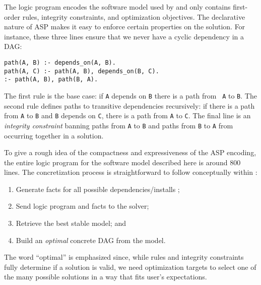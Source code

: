 The logic program encodes the software model used by \spack{} and only contains
first-order rules, integrity constraints, and optimization objectives. The declarative
nature of ASP makes it easy to enforce certain properties on the solution. For
instance, these three lines ensure that we never have a cyclic dependency in a DAG:
%
\begin{verbatim}
path(A, B) :- depends_on(A, B).
path(A, C) :- path(A, B), depends_on(B, C).
:- path(A, B), path(B, A).
\end{verbatim}
%
The first rule is the base case: if {\tt A} depends on {\tt B} there is a path from {\tt
  A} to {\tt B}. The second rule defines paths to transitive dependencies recursively:
if there is a path from {\tt A} to {\tt B} and {\tt B} depends on {\tt C}, there is a
path from {\tt A} to {\tt C}. The final line is an \emph{integrity constraint} banning
paths from {\tt A} to {\tt B} and paths from {\tt B} to {\tt A} from occurring together
in a solution.

To give a rough idea of the compactness and expressiveness of the ASP encoding, the
entire logic program for the software model described here is around $800$ lines. The
concretization process is straightforward to follow conceptually within \spack:
\begin{enumerate}
\item Generate facts for all possible dependencies/installs \footnotemark;
\item Send logic program and facts to the solver;
\item Retrieve the best stable model; and
\item Build an {\it optimal} concrete DAG from the model.
\end{enumerate}
 The word ``optimal'' is
emphasized since, while rules and integrity constraints fully determine if a solution is
valid, we need optimization targets to select one of the many possible solutions in a
way that fits user's expectations.

